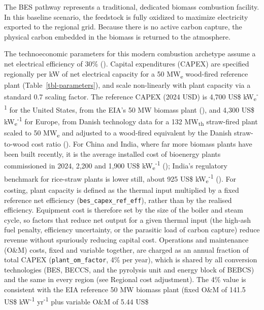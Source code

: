 \documentclass[
  letterpaper,
]{article}
\begin{document}
The BES pathway represents a traditional, dedicated biomass combustion
facility. In this baseline scenario, the feedstock is fully oxidized to
maximize electricity exported to the regional grid. Because there is no
active carbon capture, the physical carbon embedded in the biomass is
returned to the atmosphere.

The technoeconomic parameters for this modern combustion archetype
assume a net electrical efficiency of 30\%
(). Capital expenditures (CAPEX) are
specified regionally per kW of net electrical capacity for a 50
MW\textsubscript{e} wood-fired reference plant
(Table~\ref{tbl-parameters}), and scale non-linearly with plant capacity
via a standard 0.7 scaling factor. The reference CAPEX (2024 USD) is
4,700 US\$ kW\textsubscript{e}\textsuperscript{-1} for the United
States, from the EIA's 50 MW biomass plant
(), and 4,300 US\$
kW\textsubscript{e}\textsuperscript{-1} for Europe, from Danish
technology data for a 132 MW\textsubscript{th} straw-fired plant scaled
to 50 MW\textsubscript{e} and adjusted to a wood-fired equivalent by the
Danish straw-to-wood cost ratio (). For
China and India, where far more biomass plants have been built recently,
it is the average installed cost of bioenergy plants commissioned in
2024, 2,200 and 1,900 US\$ kW\textsubscript{e}\textsuperscript{-1}
(); India's regulatory benchmark for
rice-straw plants is lower still, about 925 US\$
kW\textsubscript{e}\textsuperscript{-1}
(). For costing, plant capacity is
defined as the thermal input multiplied by a fixed reference net
efficiency (\texttt{bes\_capex\_ref\_eff}), rather than by the realised
efficiency. Equipment cost is therefore set by the size of the boiler
and steam cycle, so factors that reduce net output for a given thermal
input (the high-ash fuel penalty, efficiency uncertainty, or the
parasitic load of carbon capture) reduce revenue without spuriously
reducing capital cost. Operations and maintenance (O\&M) costs, fixed
and variable together, are charged as an annual fraction of total CAPEX
(\texttt{plant\_om\_factor}, 4\% per year), which is shared by all
conversion technologies (BES, BECCS, and the pyrolysis unit and energy
block of BEBCS) and the same in every region (see Regional cost
adjustment). The 4\% value is consistent with the EIA reference 50 MW
biomass plant (fixed O\&M of 141.5 US\$ kW\textsuperscript{-1}
yr\textsuperscript{-1} plus variable O\&M of 5.44 US\$
\end{document}
